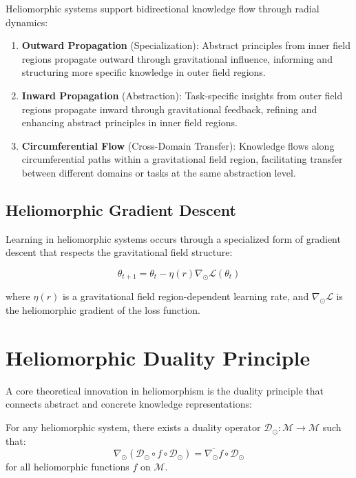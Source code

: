 Heliomorphic systems support bidirectional knowledge flow through radial dynamics:

\begin{enumerate}
    \item \textbf{Outward Propagation} (Specialization): Abstract principles from inner field regions propagate outward through gravitational influence, informing and structuring more specific knowledge in outer field regions.
    
    \item \textbf{Inward Propagation} (Abstraction): Task-specific insights from outer field regions propagate inward through gravitational feedback, refining and enhancing abstract principles in inner field regions.
    
    \item \textbf{Circumferential Flow} (Cross-Domain Transfer): Knowledge flows along circumferential paths within a gravitational field region, facilitating transfer between different domains or tasks at the same abstraction level.
\end{enumerate}

\subsection{Heliomorphic Gradient Descent}

Learning in heliomorphic systems occurs through a specialized form of gradient descent that respects the gravitational field structure:

\begin{equation}
\theta_{t+1} = \theta_t - \eta(r) \nabla_{\odot} \mathcal{L}(\theta_t)
\end{equation}

where $\eta(r)$ is a gravitational field region-dependent learning rate, and $\nabla_{\odot} \mathcal{L}$ is the heliomorphic gradient of the loss function.

\section{Heliomorphic Duality Principle}

A core theoretical innovation in heliomorphism is the duality principle that connects abstract and concrete knowledge representations:

\begin{theorem}
For any heliomorphic system, there exists a duality operator $\mathcal{D}_{\odot}: \mathcal{M} \rightarrow \mathcal{M}$ such that:
\begin{equation}
\nabla_{\odot} (\mathcal{D}_{\odot} \circ f \circ \mathcal{D}_{\odot}) = \overline{\nabla_{\odot} f} \circ \mathcal{D}_{\odot}
\end{equation}
for all heliomorphic functions $f$ on $\mathcal{M}$.
\end{theorem}

